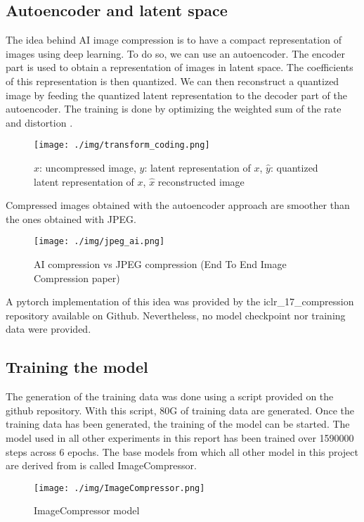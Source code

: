 \documentclass[12pt]{article}
\begin{document}
\subsection{Autoencoder and latent space}
The idea behind AI image compression is to have a compact representation of images using deep learning. To do so, we can use an autoencoder. The encoder part is used to obtain a representation of images in latent space. The coefficients of this representation is then quantized. We can then reconstruct a quantized image by feeding the quantized latent representation to the decoder part of the autoencoder. The training is done by optimizing the weighted sum of the rate and distortion \autocite{balleEndtoendOptimizedImage2017}.
\begin{figure}[H]
    \centering
    \texttt{[image: ./img/transform\_coding.png]}
    \caption[Representation of images]{$x$: uncompressed image, $y$: latent representation of $x$, $\hat{y}$: quantized latent representation of $x$, $\hat{x}$ reconstructed image}
\end{figure}
Compressed images obtained with the autoencoder approach are smoother than the ones obtained with JPEG.
\begin{figure}
    \centering
    \texttt{[image: ./img/jpeg\_ai.png]}
    \caption[AI compression vs JPEG]{AI compression vs JPEG compression (End To End Image Compression paper)}
\end{figure}

A pytorch implementation of this idea was provided by the iclr\_17\_compression repository \autocite{LiujiahengIclr_17_compressionEndtoend} available on Github. Nevertheless, no model checkpoint nor training data were provided.


\subsection{Training the model}
The generation of the training data was done using a script provided on the github repository. With this script, 80G of training data are generated. Once the training data has been generated, the training of the model can be started. The model used in all other experiments in this report has been trained over 1590000 steps across 6 epochs. The base models from which all other model in this project are derived from is called ImageCompressor.
\begin{figure}[H]
    \centering
    \texttt{[image: ./img/ImageCompressor.png]}
    \caption[ImageCompressor model]{ImageCompressor model}
\end{figure}
\end{document}
